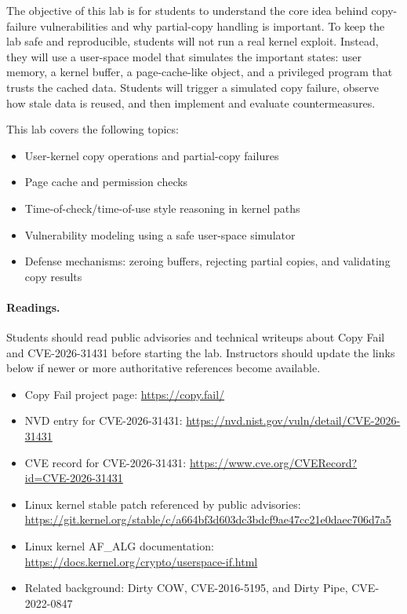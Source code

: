 The objective of this lab is for students to understand the core idea behind
copy-failure vulnerabilities and why partial-copy handling is important. To keep
the lab safe and reproducible, students will not run a real kernel exploit.
Instead, they will use a user-space model that simulates the important states:
user memory, a kernel buffer, a page-cache-like object, and a privileged
program that trusts the cached data. Students will trigger a simulated copy
failure, observe how stale data is reused, and then implement and evaluate
countermeasures.

This lab covers the following topics:

\begin{itemize}[noitemsep]
\item User-kernel copy operations and partial-copy failures
\item Page cache and permission checks
\item Time-of-check/time-of-use style reasoning in kernel paths
\item Vulnerability modeling using a safe user-space simulator
\item Defense mechanisms: zeroing buffers, rejecting partial copies, and
      validating copy results
\end{itemize}

\paragraph{Readings.}
Students should read public advisories and technical writeups about Copy Fail
and CVE-2026-31431 before starting the lab. Instructors should update the links
below if newer or more authoritative references become available.

\begin{itemize}
\item Copy Fail project page: \url{https://copy.fail/}
\item NVD entry for CVE-2026-31431:
      \url{https://nvd.nist.gov/vuln/detail/CVE-2026-31431}
\item CVE record for CVE-2026-31431: \url{https://www.cve.org/CVERecord?id=CVE-2026-31431}
\item Linux kernel stable patch referenced by public advisories:
      \url{https://git.kernel.org/stable/c/a664bf3d603dc3bdcf9ae47cc21e0daec706d7a5}
\item Linux kernel AF\_ALG documentation:
      \url{https://docs.kernel.org/crypto/userspace-if.html}
\item Related background: Dirty COW, CVE-2016-5195, and Dirty Pipe,
      CVE-2022-0847
\end{itemize}

